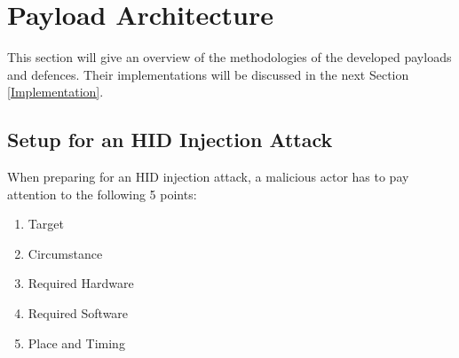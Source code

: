 \newpage
\section{Payload Architecture}


This section will give an overview of the methodologies of the developed payloads and defences. Their implementations will be discussed in the next Section \ref{Implementation}. \\


\subsection{Setup for an HID Injection Attack}

When preparing for an HID injection attack, a malicious actor has to pay attention to the following 5 points:

\begin{enumerate}[noitemsep]
    \item Target
    \item Circumstance
    \item Required Hardware
    \item Required Software
    \item Place and Timing
\end{enumerate}


